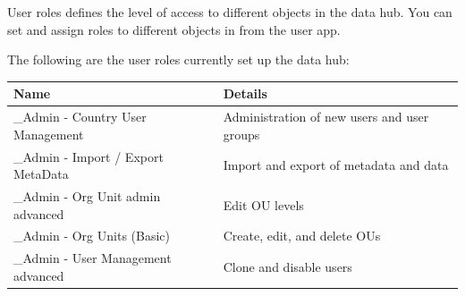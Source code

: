 \documentclass[]{book}
\begin{document}
User roles defines the level of access to different objects in the data hub. You can set and assign roles to different objects in from the user app.

The following are the user roles currently set up the data hub:

\begin{longtable}[]{@{}ll@{}}
\toprule
\begin{minipage}[b]{0.27\columnwidth}\raggedright
Name\strut
\end{minipage} & \begin{minipage}[b]{0.67\columnwidth}\raggedright
Details\strut
\end{minipage}\tabularnewline
\midrule
\endhead
\begin{minipage}[t]{0.27\columnwidth}\raggedright
\_Admin - Country User Management\strut
\end{minipage} & \begin{minipage}[t]{0.67\columnwidth}\raggedright
Administration of new users and user groups\strut
\end{minipage}\tabularnewline
\begin{minipage}[t]{0.27\columnwidth}\raggedright
\_Admin - Import / Export MetaData\strut
\end{minipage} & \begin{minipage}[t]{0.67\columnwidth}\raggedright
Import and export of metadata and data\strut
\end{minipage}\tabularnewline
\begin{minipage}[t]{0.27\columnwidth}\raggedright
\_Admin - Org Unit admin advanced\strut
\end{minipage} & \begin{minipage}[t]{0.67\columnwidth}\raggedright
Edit OU levels\strut
\end{minipage}\tabularnewline
\begin{minipage}[t]{0.27\columnwidth}\raggedright
\_Admin - Org Units (Basic)\strut
\end{minipage} & \begin{minipage}[t]{0.67\columnwidth}\raggedright
Create, edit, and delete OUs\strut
\end{minipage}\tabularnewline
\begin{minipage}[t]{0.27\columnwidth}\raggedright
\_Admin - User Management advanced\strut
\end{minipage} & \begin{minipage}[t]{0.67\columnwidth}\raggedright
Clone and disable users\strut
\end{minipage}\tabularnewline

\end{longtable}
\end{document}
